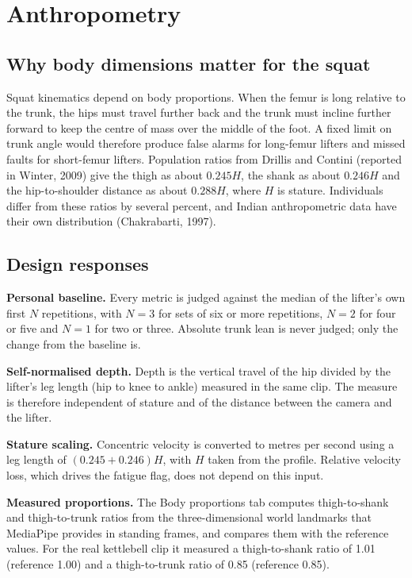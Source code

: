 \documentclass[12pt]{article}
\begin{document}
\section{Anthropometry}

\subsection{Why body dimensions matter for the squat}

Squat kinematics depend on body proportions. When the femur is long relative to the trunk, the hips must travel further back and the trunk must incline further forward to keep the centre of mass over the middle of the foot. A fixed limit on trunk angle would therefore produce false alarms for long-femur lifters and missed faults for short-femur lifters. Population ratios from Drillis and Contini (reported in Winter, 2009) give the thigh as about $0.245H$, the shank as about $0.246H$ and the hip-to-shoulder distance as about $0.288H$, where $H$ is stature. Individuals differ from these ratios by several percent, and Indian anthropometric data have their own distribution (Chakrabarti, 1997).

\subsection{Design responses}

\textbf{Personal baseline.} Every metric is judged against the median of the lifter's own first $N$ repetitions, with $N=3$ for sets of six or more repetitions, $N=2$ for four or five and $N=1$ for two or three. Absolute trunk lean is never judged; only the change from the baseline is.

\textbf{Self-normalised depth.} Depth is the vertical travel of the hip divided by the lifter's leg length (hip to knee to ankle) measured in the same clip. The measure is therefore independent of stature and of the distance between the camera and the lifter.

\textbf{Stature scaling.} Concentric velocity is converted to metres per second using a leg length of $(0.245 + 0.246)H$, with $H$ taken from the profile. Relative velocity loss, which drives the fatigue flag, does not depend on this input.

\textbf{Measured proportions.} The Body proportions tab computes thigh-to-shank and thigh-to-trunk ratios from the three-dimensional world landmarks that MediaPipe provides in standing frames, and compares them with the reference values. For the real kettlebell clip it measured a thigh-to-shank ratio of 1.01 (reference 1.00) and a thigh-to-trunk ratio of 0.85 (reference 0.85).
\end{document}

